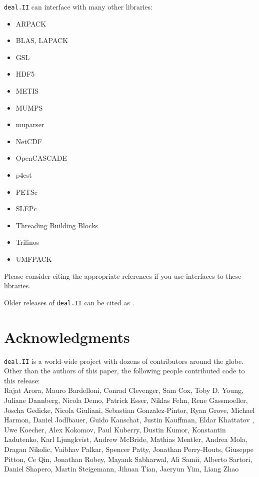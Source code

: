 \documentclass{ansarticle-preprint}
\newcommand{\specialword}[1]{\texttt{#1}}
\newcommand{\dealii}{{\specialword{deal.II}}}
\begin{document}
\dealii{} can interface with many other libraries:
\begin{multicols}{2}
\begin{itemize}
\item ARPACK \cite{arpack}
\item BLAS, LAPACK
\item GSL \cite{gsl2016}
\item HDF5 \cite{hdf5}
\item METIS \cite{karypis1998fast}
\item MUMPS \cite{ADE00,MUMPS:1,MUMPS:2,mumps-web-page}
\item muparser \cite{muparser-web-page}
\item NetCDF \cite{rew1990netcdf}
\item OpenCASCADE \cite{opencascade-web-page}
\item p4est \cite{p4est}
\item PETSc \cite{petsc-user-ref,petsc-web-page}
\item SLEPc \cite{Hernandez:2005:SSF}
\item Threading Building Blocks \cite{Rei07}
\item Trilinos \cite{trilinos,trilinos-web-page}
\item UMFPACK \cite{umfpack}
\end{itemize}
\end{multicols}
Please consider citing the appropriate references if you use interfaces to these
libraries.

Older releases of \dealii{} can be cited as \cite{dealII80,dealII81,dealII82,dealII83,dealII84}.

\nocite{BangerthKanschat1999}

\section{Acknowledgments}

\dealii{} is a world-wide project with dozens of contributors around the
globe. Other than the authors of this paper, the following people contributed code to
this release:\\
%
%

  Rajat Arora,
  Mauro Bardelloni,
  Conrad Clevenger,
  Sam Cox,
  Toby D. Young,
  Juliane Dannberg,
  Nicola Demo,
  Patrick Esser,
  Niklas Fehn,
  Rene Gassmoeller,
  Joscha Gedicke,
  Nicola Giuliani,
  Sebastian Gonzalez-Pintor,
  Ryan Grove,
  Michael Harmon,
  Daniel Jodlbauer,
  Guido Kanschat,
  Justin Kauffman,
  Eldar Khattatov ,
  Uwe Koecher,
  Alex Kokomov,
  Paul Kuberry,
  Dustin Kumor,
  Konstantin Ladutenko,
  Karl Ljungkvist,
  Andrew McBride,
  Mathias Mentler,
  Andrea Mola,
  Dragan Nikolic,
  Vaibhav Palkar,
  Spencer Patty,
  Jonathan Perry-Houts,
  Giuseppe Pitton,
  Ce Qin,
  Jonathan Robey,
  Mayank Sabharwal,
  Ali Samii,
  Alberto Sartori,
  Daniel Shapero,
  Martin Steigemann,
  Jihuan Tian,
  Jaeryun Yim,
  Liang Zhao
\end{document}
